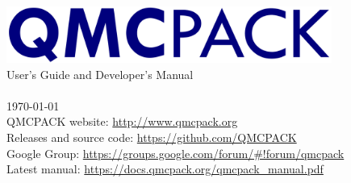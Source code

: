 
\begin{titlepage}
\vspace*{\fill}
\begin{center}

\includegraphics[width=0.8\textwidth]{./figures/QMCPACK_logo.png} \\
{\huge User's Guide and Developer's Manual\\}
{\huge \QMCPACKver \\}
{\huge %
\today}\\
\vspace{2.5cm}
{\small QMCPACK website: \url{http://www.qmcpack.org}}\\
{\small Releases and source code:  \url{https://github.com/QMCPACK}}\\
{\small Google Group: \url{https://groups.google.com/forum/#!forum/qmcpack}}\\
{\small Latest manual: \url{https://docs.qmcpack.org/qmcpack_manual.pdf}}
\end{center}
\vspace*{\fill}
\end{titlepage}
